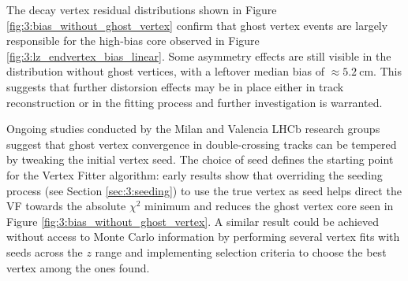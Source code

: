 %


The \lz decay vertex residual distributions shown in Figure \ref{fig:3:bias_without_ghost_vertex} confirm that ghost vertex events are largely responsible for the high-bias core observed in Figure \ref{fig:3:lz_endvertex_bias_linear}.
Some asymmetry effects are still visible in the distribution without ghost vertices, with a leftover median bias of $\approx \SI{5.2}{\centi\meter}$.
This suggests that further distorsion effects may be in place either in track reconstruction or in the fitting process and further investigation is warranted.


Ongoing studies conducted by the Milan and Valencia LHCb research groups suggest that ghost vertex convergence in double-crossing tracks can be tempered by tweaking the initial vertex seed.
The choice of seed defines the starting point for the Vertex Fitter algorithm:
early results show that overriding the seeding process (see Section \ref{sec:3:seeding}) to use the true \lambdadecay vertex as seed helps direct the VF towards the absolute $\chi^2$ minimum and reduces the ghost vertex core seen in Figure \ref{fig:3:bias_without_ghost_vertex}.
A similar result could be achieved without access to Monte Carlo information by performing several vertex fits with seeds across the $z$ range and implementing selection criteria to choose the best vertex among the ones found.

